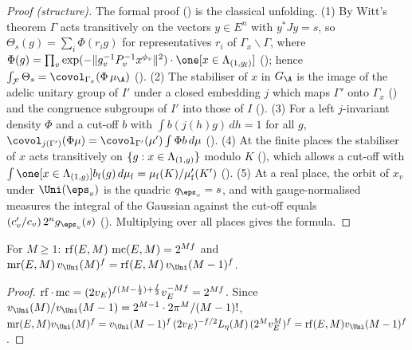 \begin{proof}[Proof (structure)]
The formal proof () is the classical unfolding. (1) By Witt's theorem
$\Gamma$ acts transitively on the vectors $y\in E^n$ with $y^*Jy=s$, so
$\Theta_s(g)=\sum_i\Phi(r_ig)$ for representatives $r_i$ of $\Gamma_x\backslash\Gamma$, where
$\Phi(g)=\prod_v\exp(-\|g_v^{-1}P_v^{-1}x^{\phi_v}\|^2)\cdot\one[x\in\rowsLv_{(1,g_{\mathrm f})}]$
(); hence
$\int_{\mathcal F}\Theta_s=\covol_{\Gamma_x}(\Phi\,\mu_{\A})$
(). (2) The stabiliser of $x$ in $\rowsGA$
is the image of the adelic unitary group of $I'$ under a closed embedding $j$ which maps $\Gamma'$ onto $\Gamma_x$
() and the congruence subgroups
of $I'$ into those of $I$ (). (3) For a left
$j$-invariant density $\Phi$ and a cut-off $b$ with $\int b(j(h)g)\,dh=1$ for all $g$,
$\covol_{j(\Gamma')}(\Phi\mu)=\covol_{\Gamma'}(\mu')\int\Phi b\,d\mu$
(). (4) At the finite places the stabiliser
of $x$ acts transitively on $\{g: x\in\Lambda_{(1,g)}\}$ modulo $K$
(), which allows a cut-off with
$\int\one[x\in\rowsLv_{(1,g)}]b_{\mathrm f}(g)\,d\mu_{\mathrm f}=\mu_{\mathrm f}(K)/\mu'_{\mathrm f}(K')$
(). (5) At a real place, the orbit of $x_v$ under
$\Uni(\eps_v)$ is the quadric $q_{\eps_v}=s$, and with gauge-normalised measures the integral of the Gaussian against the
cut-off equals $(c'_v/c_v)\,2^n g_{\eps_v}(s)$ (). Multiplying over all
places gives the formula.
\end{proof}

\begin{lemma}[Constants]\label{pf:rows:constants}
For $M\ge1$: $\operatorname{rf}(E,M)\,\operatorname{mc}(E,M)=2^{Mf}$ and $\rowsmr(E,M)\,\rowsvU(M)^f=\rowsrf(E,M)\,\rowsvU(M-1)^f$.
\end{lemma}

\begin{proof}
$\operatorname{rf}\cdot\operatorname{mc}=(2v_E)^{f(M-\frac12)+\frac f2}v_E^{-Mf}=2^{Mf}$. Since
$\rowsvU(M)/\rowsvU(M-1)=2^{M-1}\cdot2\pi^M/(M-1)!$,
$\rowsmr(E,M)\rowsvU(M)^f=\rowsvU(M-1)^f\,(2v_E)^{-f/2}L_\eta(M)\,(2^Mv_E^M)^f=\rowsrf(E,M)\rowsvU(M-1)^f$.
\end{proof}


